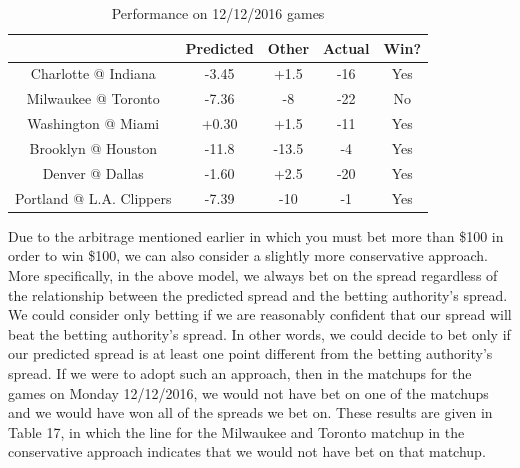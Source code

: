 \documentclass{article}
\begin{document}
\begin{table}
  \begin{center}
    \begin{tabular}{ | c | c | c | c | c | }
      \hline
                                & Predicted     & Other  & Actual & Win?  \\ \hline
      Charlotte @ Indiana       & -3.45         & +1.5   & -16    & Yes   \\ \hline
      Milwaukee @ Toronto       & -7.36         & -8     & -22    & No   \\ \hline
      Washington @ Miami        & +0.30         & +1.5   & -11    & Yes    \\ \hline
      Brooklyn @ Houston        & -11.8         & -13.5  & -4     & Yes   \\ \hline
      Denver @ Dallas           & -1.60         & +2.5   & -20    & Yes   \\ \hline
      Portland @ L.A. Clippers  & -7.39         & -10    & -1     & Yes   \\ \hline
    \end{tabular}
  \end{center}
  \caption{Performance on 12/12/2016 games}
\end{table}

Due to the arbitrage mentioned earlier in which you must bet more than \$100 in order to win \$100, we can also consider a slightly more conservative approach. More specifically, in the above model, we always bet on the spread regardless of the relationship between the predicted spread and the betting authority's spread. We could consider only betting if we are reasonably confident that our spread will beat the betting authority's spread. In other words, we could decide to bet only if our predicted spread is at least one point different from the betting authority's spread. If we were to adopt such an approach, then in the matchups for the games on Monday 12/12/2016, we would not have bet on one of the matchups and we would have won all of the spreads we bet on. These results are given in Table 17, in which the line for the Milwaukee and Toronto matchup in the conservative approach indicates that we would not have bet on that matchup.
\end{document}
